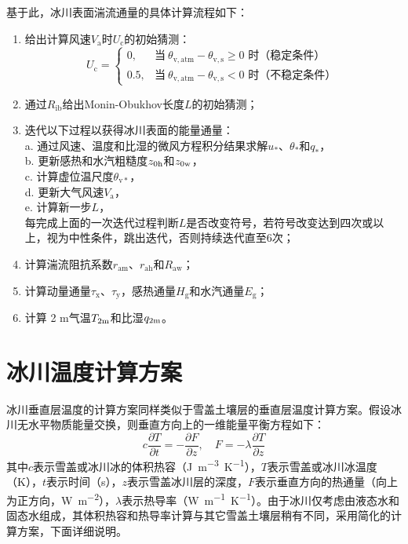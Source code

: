 基于此，冰川表面湍流通量的具体计算流程如下：
\begin{enumerate}
  \item 给出计算风速$V_{\mathrm {a}} $时$U_{\mathrm {c}} $的初始猜测：
    \begin{equation}
      U_{\mathrm {c}}  = \begin{cases}
        0, &\text{当}\ \theta_{\mathrm{v,atm}}-\theta_{\mathrm{v,s}} \geqslant 0 \text{ 时（稳定条件）} \\
        0.5, &\text{当}\ \theta_{\mathrm{v,atm}}-\theta_{\mathrm{v,s}} < 0 \text{ 时（不稳定条件）}
      \end{cases}
    \end{equation}
  \item 通过$R_{\mathrm{ib}}$给出Monin-Obukhov长度$L$的初始猜测；
  \item 迭代以下过程以获得冰川表面的能量通量：\\
    a. 通过风速、温度和比湿的微风方程积分结果求解$u_*$、$\theta_*$和$q_*$，\\
    b. 更新感热和水汽粗糙度$z_{\rm 0h}$和$z_{\rm 0w}$，\\
    c. 计算虚位温尺度$\theta_{\mathrm{v*}}$，\\
    d. 更新大气风速$V_{\mathrm {a}} $，\\
    e. 计算新一步$L$，\\
    每完成上面的一次迭代过程判断$L$是否改变符号，若符号改变达到四次或以上，视为中性条件，跳出迭代，否则持续迭代直至6次；
  \item 计算湍流阻抗系数$r_{\mathrm{am}}$、$r_{\mathrm{ah}}$和$R_{\mathrm{aw}}$；
  \item 计算动量通量$\tau_{\mathrm {x}} $、$\tau_{\mathrm {y}} $，感热通量$H_{\mathrm {g}} $和水汽通量$E_{\mathrm {g}} $；
  \item 计算 2 m气温$T_{\rm 2m}$和比湿$q_{\rm 2m}$。
\end{enumerate}

\section{冰川温度计算方案}
冰川垂直层温度的计算方案同样类似于雪盖土壤层的垂直层温度计算方案。假设冰川无水平物质能量交换，则垂直方向上的一维能量平衡方程如下：
\begin{equation}\label{eq:GlacierThermalCons}
  c \frac{\partial T}{\partial t}=-\frac{\partial F}{\partial z},  \quad F=-\lambda \frac{\partial T}{\partial z}
\end{equation}
其中$c$表示雪盖或冰川冰的体积热容（\unit{J.m^{-3}.K^{-1}}），$T$表示雪盖或冰川冰温度（K），$t$表示时间（s），$z$表示雪盖冰川层的深度，$F$表示垂直方向的热通量（向上为正方向，\unit{W.m^{-2}}），$\lambda$表示热导率（\unit{W.m^{-1}.K^{-1}}）。由于冰川仅考虑由液态水和固态水组成，其体积热容和热导率计算与其它雪盖土壤层稍有不同，采用简化的计算方案，下面详细说明。

